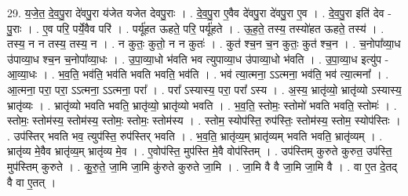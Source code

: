 \documentclass[17pt]{extarticle}
\begin{document}
29. य॒जे॒त॒ दे॒व॒पु॒रा दे॑वपु॒रा य॑जेत यजेत देवपु॒राः । . दे॒व॒पु॒रा ए॒वैव दे॑वपु॒रा दे॑वपु॒रा ए॒व । . दे॒व॒पु॒रा इति॑ देव - पु॒राः । . ए॒व परि॒ पर्ये॒वैव परि॑ । . पर्यू॑हत ऊहते॒ परि॒ पर्यू॑हते । . ऊ॒ह॒ते॒ तस्य॒ तस्यो॑हत ऊहते॒ तस्य॑ । . तस्य॒ न न तस्य॒ तस्य॒ न । . न कुतः॒ कुतो॒ न न कुतः॑ । . कुत॑ श्च॒न च॒न कुतः॒ कुत॑ श्च॒न । . च॒नोपा᳚व्या॒ध उ॑पाव्या॒ध श्च॒न च॒नोपा᳚व्या॒धः । . उ॒पा॒व्या॒धो भ॑वति भव त्युपाव्या॒ध उ॑पाव्या॒धो भ॑वति । . उ॒पा॒व्या॒ध इत्यु॑प - आ॒व्या॒धः । . भ॒व॒ति॒ भव॑ति॒ भव॑ति भवति भवति॒ भव॑ति । . भव॑ त्या॒त्मना॒ ऽऽत्मना॒ भव॑ति॒ भव॑ त्या॒त्मना᳚ । . आ॒त्मना॒ परा॒ परा॒ ऽऽत्मना॒ ऽऽत्मना॒ परा᳚ । . परा᳚ ऽस्यास्य॒ परा॒ परा᳚ ऽस्य । . अ॒स्य॒ भ्रातृ॑व्यो॒ भ्रातृ॑व्यो ऽस्यास्य॒ भ्रातृ॑व्यः । . भ्रातृ॑व्यो भवति भवति॒ भ्रातृ॑व्यो॒ भ्रातृ॑व्यो भवति । . भ॒व॒ति॒ स्तोमः॒ स्तोमो॑ भवति भवति॒ स्तोमः॑ । . स्तोमः॒ स्तोम॑स्य॒ स्तोम॑स्य॒ स्तोमः॒ स्तोमः॒ स्तोम॑स्य । . स्तोम॒ स्योप॑स्ति॒ रुप॑स्तिः॒ स्तोम॑स्य॒ स्तोम॒ स्योप॑स्तिः । . उप॑स्तिर् भवति भव॒ त्युप॑स्ति॒ रुप॑स्तिर् भवति । . भ॒व॒ति॒ भ्रातृ॑व्य॒म् भ्रातृ॑व्यम् भवति भवति॒ भ्रातृ॑व्यम् । . भ्रातृ॑व्य मे॒वैव भ्रातृ॑व्य॒म् भ्रातृ॑व्य मे॒व । . ए॒वोप॑स्ति॒ मुप॑स्ति मे॒वै वोप॑स्तिम् । . उप॑स्तिम् कुरुते कुरुत॒ उप॑स्ति॒ मुप॑स्तिम् कुरुते । . कु॒रु॒ते॒ जा॒मि जा॒मि कु॑रुते कुरुते जा॒मि । . जा॒मि वै वै जा॒मि जा॒मि वै । . वा ए॒त दे॒तद् वै वा ए॒तत् । \newline
\end{document}
